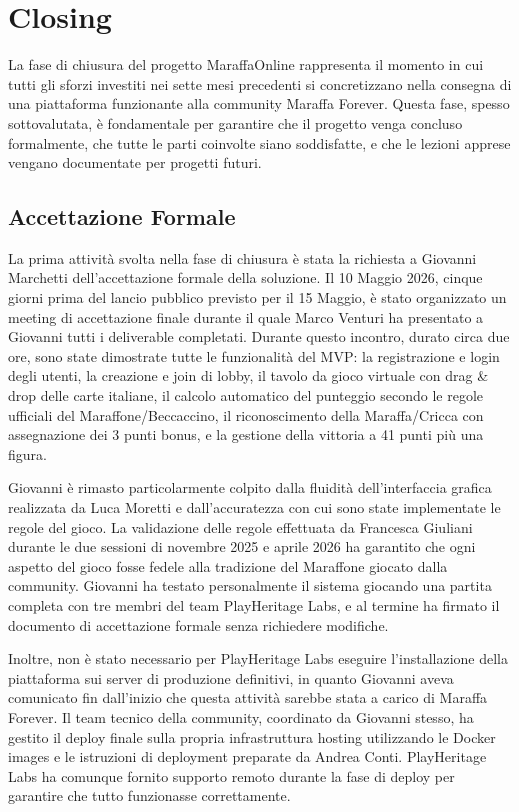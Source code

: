 \chapter{Closing}

La fase di chiusura del progetto MaraffaOnline rappresenta il momento in cui tutti gli sforzi investiti nei sette mesi precedenti si concretizzano nella consegna di una piattaforma funzionante alla community Maraffa Forever. Questa fase, spesso sottovalutata, è fondamentale per garantire che il progetto venga concluso formalmente, che tutte le parti coinvolte siano soddisfatte, e che le lezioni apprese vengano documentate per progetti futuri.

\section{Accettazione Formale}

La prima attività svolta nella fase di chiusura è stata la richiesta a Giovanni Marchetti dell'accettazione formale della soluzione. Il 10 Maggio 2026, cinque giorni prima del lancio pubblico previsto per il 15 Maggio, è stato organizzato un meeting di accettazione finale durante il quale Marco Venturi ha presentato a Giovanni tutti i deliverable completati. Durante questo incontro, durato circa due ore, sono state dimostrate tutte le funzionalità del MVP: la registrazione e login degli utenti, la creazione e join di lobby, il tavolo da gioco virtuale con drag \& drop delle carte italiane, il calcolo automatico del punteggio secondo le regole ufficiali del Maraffone/Beccaccino, il riconoscimento della Maraffa/Cricca con assegnazione dei 3 punti bonus, e la gestione della vittoria a 41 punti più una figura.

Giovanni è rimasto particolarmente colpito dalla fluidità dell'interfaccia grafica realizzata da Luca Moretti e dall'accuratezza con cui sono state implementate le regole del gioco. La validazione delle regole effettuata da Francesca Giuliani durante le due sessioni di novembre 2025 e aprile 2026 ha garantito che ogni aspetto del gioco fosse fedele alla tradizione del Maraffone giocato dalla community. Giovanni ha testato personalmente il sistema giocando una partita completa con tre membri del team PlayHeritage Labs, e al termine ha firmato il documento di accettazione formale senza richiedere modifiche.

Inoltre, non è stato necessario per PlayHeritage Labs eseguire l'installazione della piattaforma sui server di produzione definitivi, in quanto Giovanni aveva comunicato fin dall'inizio che questa attività sarebbe stata a carico di Maraffa Forever. Il team tecnico della community, coordinato da Giovanni stesso, ha gestito il deploy finale sulla propria infrastruttura hosting utilizzando le Docker images e le istruzioni di deployment preparate da Andrea Conti. PlayHeritage Labs ha comunque fornito supporto remoto durante la fase di deploy per garantire che tutto funzionasse correttamente.

